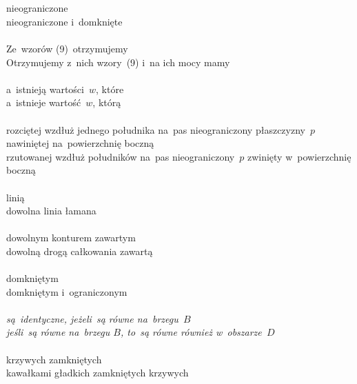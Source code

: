 \documentclass[a4paper,11pt]{article}
\begin{document}
\noi \\
 \\
\Jest nieograniczone \\
\Pow  nieograniczone i~domknięte \\
 \\
\Jest Ze~wzorów (9)~otrzymujemy \\
\Pow  Otrzymujemy z~nich wzory~(9) i~na ich mocy mamy \\
 \\
\Jest a~istnieją wartości~$w$, które \\
\Pow  a~istnieje wartość~$w$, którą \\
 \\
\Jest rozciętej wzdłuż jednego południka na~pas nieograniczony
płaszczyzny~$p$ nawiniętej na~powierzchnię boczną \\
\Pow rzutowanej wzdłuż południków na~pas nieograniczony~$p$ zwinięty
w~powierzchnię boczną \\
 \\
\Jest linią \\
\Pow dowolna linia łamana \\
 \\
\Jest dowolnym konturem zawartym \\
\Pow  dowolną drogą całkowania zawartą \\
 \\
\Jest domkniętym \\
\Pow  domkniętym i~ograniczonym \\
 \\
\Jest \emph{są~identyczne, jeżeli~są równe na~brzegu~$B$} \\
\Pow \emph{jeśli~są równe na~brzegu $B$, to~są równe również
  w~obszarze~$D$} \\
 \\
\Jest krzywych zamkniętych \\
\Pow  kawałkami gładkich zamkniętych krzywych \\

\vspace{\spaceTwo}





\end{document}

